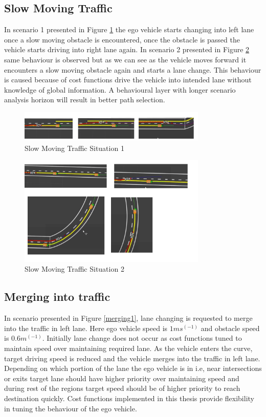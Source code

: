 \subsection{Slow Moving Traffic}
In scenario 1 presented in Figure \ref{slow_moving_1} the ego vehicle starts changing into left lane once a slow moving obstacle is encountered, once the obstacle is passed the vehicle starts driving into right lane again. In scenario 2 presented in Figure \ref{slow_moving_2} same behaviour is observed but as we can see as the vehicle moves forward it encounters a slow moving obstacle again and starts a lane change. This behaviour is caused because of cost functions drive the vehicle into intended lane without knowledge of global information. A behavioural layer with longer scenario analysis horizon will result in better path selection.
\begin{figure}[H]
    \centering
    \includegraphics[width=0.8\textwidth]{Images/evaluation/slow_moving1.jpg}
    \caption{Slow Moving Traffic Situation 1}
    \label{slow_moving_1}
\end{figure}

\begin{figure}[H]
    \centering
    \includegraphics[width=0.8\textwidth]{Images/evaluation/slow_moving2.jpg}
    \caption{Slow Moving Traffic Situation 2}
    \label{slow_moving_2}
\end{figure}

\subsection{Merging into traffic}

In scenario presented in Figure \ref{merging1}, lane changing is requested to merge into the traffic in left lane. Here ego vehicle speed is $1ms^(-1)$ and obstacle speed is $0.6m^(-1)$. Initially lane change does not occur as cost functions tuned to maintain speed over maintaining required lane. As the vehicle enters the curve, target driving speed is reduced and the vehicle merges into the traffic in left lane. Depending on which portion of the lane the ego vehicle is in i.e, near intersections or exits target lane should have higher priority over maintaining speed and during rest of the regions target speed should be of higher priority to reach destination quickly. Cost functions implemented in this thesis provide flexibility in tuning the behaviour of the ego vehicle. 

